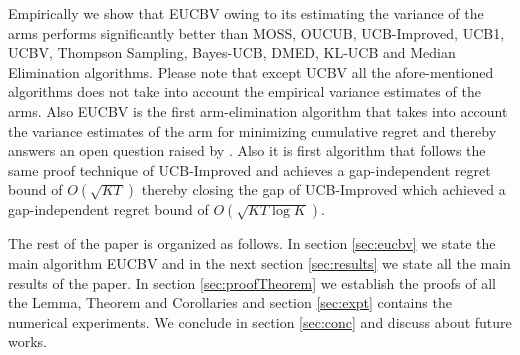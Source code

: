 Empirically we show that EUCBV owing to its estimating the variance of the arms performs significantly better than MOSS, OUCUB, UCB-Improved, UCB1, UCBV, Thompson Sampling, Bayes-UCB, DMED, KL-UCB and Median Elimination algorithms. Please note that except UCBV all the afore-mentioned algorithms does not take into account the empirical variance estimates of the arms. Also EUCBV is the first arm-elimination algorithm that takes into account the variance estimates of the arm for minimizing cumulative regret and thereby answers an open question raised by \citet{auer2010ucb}. Also it is first algorithm that follows the same proof technique of UCB-Improved and achieves a gap-independent regret bound of $O\left( \sqrt{KT} \right)$ thereby closing the gap of UCB-Improved \citep{auer2010ucb} which achieved a gap-independent regret bound of $O\left( \sqrt{KT\log K} \right)$. 
	
	The rest of the paper is organized as follows. In section \ref{sec:eucbv} we state the main algorithm EUCBV and in the next section \ref{sec:results} we state all the main results of the paper. In  section \ref{sec:proofTheorem} we establish the proofs of all the Lemma, Theorem and Corollaries and section \ref{sec:expt} contains the numerical experiments. We conclude in section \ref{sec:conc} and discuss about future works.